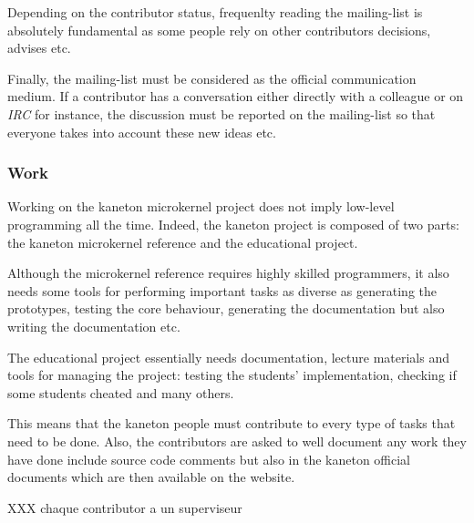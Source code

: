 Depending on the contributor status, frequenlty reading the mailing-list is
absolutely fundamental as some people rely on other contributors decisions,
advises etc.

Finally, the mailing-list must be considered as the official communication
medium. If a contributor has a conversation either directly with a colleague
or on \textit{IRC} for instance, the discussion must be reported on the
mailing-list so that everyone takes into account these new ideas etc.


\subsubsection{Work}

Working on the kaneton microkernel project does not imply low-level programming
all the time. Indeed, the kaneton project is composed of two parts: the
kaneton microkernel reference and the educational project.

Although the microkernel reference requires highly skilled programmers,
it also needs some tools for performing important tasks as diverse as
generating the prototypes, testing the core behaviour, generating the
documentation but also writing the documentation etc.

The educational project essentially needs documentation, lecture materials
and tools for managing the project: testing the students' implementation,
checking if some students cheated and many others.

This means that the kaneton people must contribute to every type of tasks
that need to be done. Also, the contributors are asked to well document
any work they have done include source code comments but also in the
kaneton official documents which are then available on the website.

XXX chaque contributor a un superviseur

